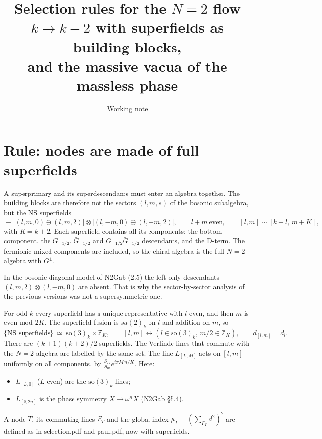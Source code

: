 \documentclass[11pt]{article}
\title{Selection rules for the $N=2$ flow $k\to k-2$ with superfields as building blocks,\\ and the massive vacua of the massless phase}
\date{Working note}
\newcommand{\so}{\mathrm{so}(3)_k}
\newcommand{\Z}{\mathbb{Z}}
\begin{document}
\maketitle

\section{Rule: nodes are made of full superfields}

A superprimary and its superdescendants must enter an algebra together. The building blocks are therefore not the sectors $(l,m,s)$ of the bosonic subalgebra, but the NS superfields
\begin{equation}
[l,m]\equiv\big[(l,m,0)\oplus(l,m,2)\big]\otimes\overline{\big[(l,-m,0)\oplus(l,-m,2)\big]},\qquad l+m\ \text{even},\qquad [l,m]\sim[k-l,\,m+K],
\end{equation}
with $K=k+2$.
Each superfield contains all its components: the bottom component, the $G_{-1/2}$, $\bar G_{-1/2}$ and $G_{-1/2}\bar G_{-1/2}$ descendants, and the D-term. The fermionic mixed components are included, so the chiral algebra is the full $N=2$ algebra with $G^\pm$.

In the bosonic diagonal model of N2Gab (2.5) the left-only descendants $(l,m,2)\otimes\overline{(l,-m,0)}$ are absent. That is why the sector-by-sector analysis of the previous versions was not a supersymmetric one.

For odd $k$ every superfield has a unique representative with $l$ even, and then $m$ is even mod $2K$. The superfield fusion is $su(2)_k$ on $l$ and addition on $m$, so
\begin{equation}
\{\text{NS superfields}\}\ \simeq\ \so\times\Z_K,\qquad [l,m]\leftrightarrow(l\in\so,\ m/2\in\Z_K),\qquad d_{[l,m]}=d_l .
\end{equation}
There are $(k+1)(k+2)/2$ superfields. The Verlinde lines that commute with the $N=2$ algebra are labelled by the same set. The line $L_{[L,M]}$ acts on $[l,m]$ uniformly on all components, by $\frac{S_{Ll}}{S_{0l}}e^{i\pi Mm/K}$. Here:
\begin{itemize}
\item $L_{[L,0]}$ ($L$ even) are the $\so$ lines;
\item $L_{[0,2n]}$ is the phase symmetry $X\to\omega^nX$ (N2Gab \S5.4).
\end{itemize}
A node $T$, its commuting lines $F_T$ and the global index $\mu_T=(\sum_{F_T}d^2)^2$ are defined as in selection.pdf and paul.pdf, now with superfields.
\end{document}
